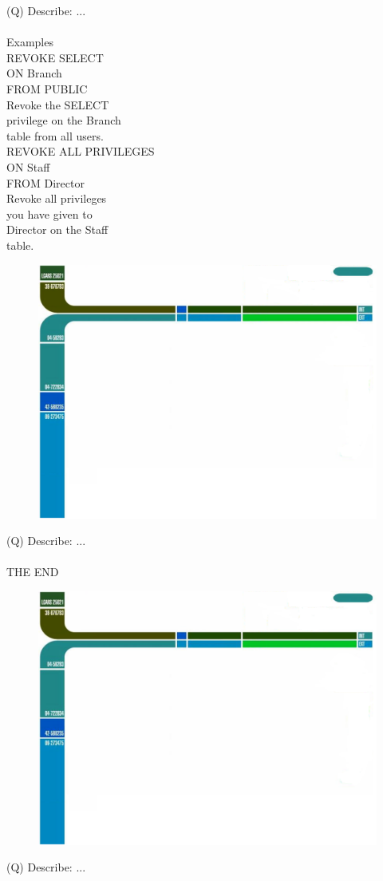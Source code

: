 \documentclass[12pt]{article}
\begin{document}
\clearpage
(Q)
Describe: ...
\\ 
 \\
Examples\\
REVOKE SELECT\\
ON Branch\\
FROM PUBLIC\\
Revoke the SELECT \\
privilege on the Branch \\
table from all users.\\
REVOKE ALL PRIVILEGES\\
ON Staff\\
FROM Director\\
Revoke all privileges \\
you have given to \\
Director on the Staff \\
table.\\
\begin{figure}[H]
\includegraphics[width=0.5\linewidth]{page25-image-1.png}
\end{figure}
\clearpage
(Q)
Describe: ...
\\ 
 \\
THE END\\
\begin{figure}[H]
\includegraphics[width=0.5\linewidth]{page26-image-1.png}
\end{figure}
\clearpage
(Q)
Describe: ...
\clearpage
\\ 
\end{document}
